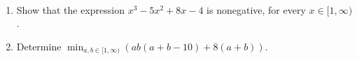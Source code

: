 \ \begin{enumerate}[label = (\alph*)]
	\item 
Show that the expression $ x^3-5x^2+8x-4 $ is nonegative, for every $ x\in [1,\infty )$.

\item Determine $ \min_{a,b\in [1,\infty )} \left( ab(a+b-10) +8(a+b) \right)$.
\end{enumerate}
